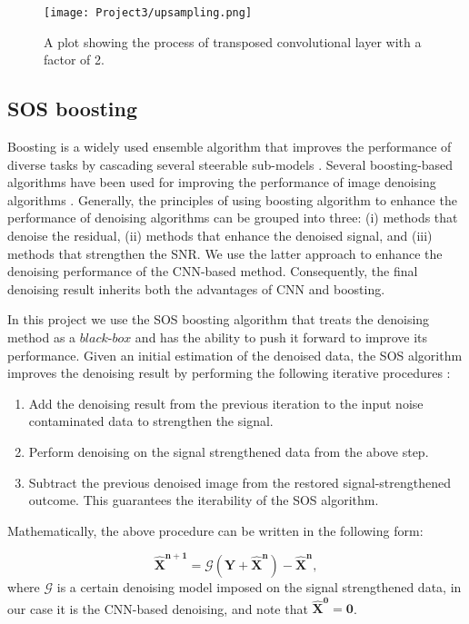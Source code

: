 \documentclass[a4paper]{article}
\begin{document}
\begin{figure}[H]
  \centering
  \texttt{[image: Project3/upsampling.png]}
  \caption{A plot showing the process of transposed convolutional layer with a factor of 2.}
    \label{sampling}
\end{figure}

\subsection{SOS boosting}
Boosting is a widely used ensemble algorithm that improves the performance of diverse tasks by cascading several steerable sub-models \cite{ChenXTW18} \cite{Pankaj}. Several boosting-based algorithms have been used for improving the performance of image denoising algorithms \cite{ChenXTW18} \cite{RomanoE15}.  Generally, the principles of using boosting algorithm to enhance the performance of denoising algorithms can be grouped into three: (i) methods that denoise the residual, (ii) methods that enhance the denoised signal, and (iii) methods that strengthen the SNR. We use the latter approach to enhance the denoising performance of the CNN-based method. Consequently, the final denoising result inherits both the advantages of CNN and boosting. 

In this project we use the SOS boosting algorithm that treats the denoising method as a $\textit{black-box}$ and has the ability to push it forward to improve its performance. Given an initial estimation of the denoised data, the SOS algorithm improves the denoising result by performing the following iterative procedures \cite{RomanoE15}:
\begin{enumerate}
    \item Add the denoising result from the previous iteration to the input noise contaminated data to strengthen the signal.
    \item Perform denoising on the signal strengthened data from the above step.
    \item Subtract the previous denoised image from the restored signal-strengthened outcome. This guarantees the iterability of the SOS algorithm.
\end{enumerate}

Mathematically, the above procedure can be written in the following form:

\begin{equation}
\mathbf{\hat{X}^{n+1}} = \mathcal{G}(\mathbf{Y}+\mathbf{\hat{X}^n}) - \mathbf{\hat{X}^n},
\label{eqn2}
\end{equation}
where $\mathcal{G}$ is a certain denoising model imposed on the signal strengthened data, in our case it is the CNN-based denoising, and note that $\mathbf{\hat{X}^0}=\mathbf{0}$. 
\end{document}
